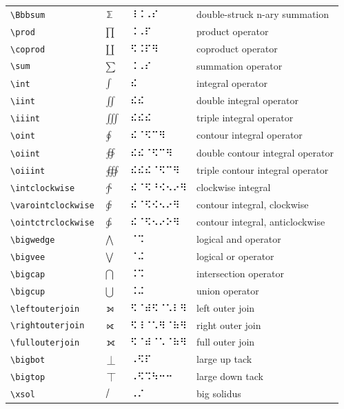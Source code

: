 \documentclass[oneside]{article}
\begin{document}
\begin{longtable}{llll}
\verb|\Bbbsum| & $\Bbbsum$ &  ⠸⠨⠠⠎  & {double-struck n-ary summation} \\[2ex]
\verb|\prod| & $\prod$ &  ⠨⠠⠏  & {product operator} \\[2ex]
\verb|\coprod| & $\coprod$ &  ⠫⠨⠏⠻  & {coproduct operator} \\[2ex]
\verb|\sum| & $\sum$ &  ⠨⠠⠎  & {summation operator} \\[2ex]
\verb|\int| & $\int$ &  ⠮  & {integral operator} \\[2ex]
\verb|\iint| & $\iint$ &  ⠮⠮  & {double integral operator} \\[2ex]
\verb|\iiint| & $\iiint$ &  ⠮⠮⠮  & {triple integral operator} \\[2ex]
\verb|\oint| & $\oint$ &  ⠮⠈⠫⠉⠻  & {contour integral operator} \\[2ex]
\verb|\oiint| & $\oiint$ &  ⠮⠮⠈⠫⠉⠻  & {double contour integral operator} \\[2ex]
\verb|\oiiint| & $\oiiint$ &  ⠮⠮⠮⠈⠫⠉⠻  & {triple contour integral operator} \\[2ex]
\verb|\intclockwise| & $\intclockwise$ &  ⠮⠈⠫⠘⠪⠢⠔⠻  & {clockwise integral} \\[2ex]
\verb|\varointclockwise| & $\varointclockwise$ &  ⠮⠈⠫⠪⠢⠔⠻  & {contour integral, clockwise} \\[2ex]
\verb|\ointctrclockwise| & $\ointctrclockwise$ &  ⠮⠈⠫⠢⠔⠕⠻  & {contour integral, anticlockwise} \\[2ex]
\verb|\bigwedge| & $\bigwedge$ &  ⠈⠩  & {logical and operator} \\[2ex]
\verb|\bigvee| & $\bigvee$ &  ⠈⠬  & {logical or operator} \\[2ex]
\verb|\bigcap| & $\bigcap$ &  ⠨⠩  & {intersection operator} \\[2ex]
\verb|\bigcup| & $\bigcup$ &  ⠨⠬  & {union operator} \\[2ex]
\verb|\leftouterjoin| & $\leftouterjoin$ &  ⠫⠈⠾⠫⠈⠡⠇⠻  & {left outer join} \\[2ex]
\verb|\rightouterjoin| & $\rightouterjoin$ &  ⠫⠸⠈⠡⠻⠈⠷⠻  & {right outer join} \\[2ex]
\verb|\fullouterjoin| & $\fullouterjoin$ &  ⠫⠈⠾⠈⠡⠈⠷⠻  & {full outer join} \\[2ex]
\verb|\bigbot| & $\bigbot$ &  ⠠⠫⠏  & {large up tack} \\[2ex]
\verb|\bigtop| & $\bigtop$ &  ⠠⠫⠩⠳⠒⠒  & {large down tack} \\[2ex]
\verb|\xsol| & $\xsol$ &  ⠠⠌  & {big solidus} \\[2ex]

\end{longtable}
\end{document}
